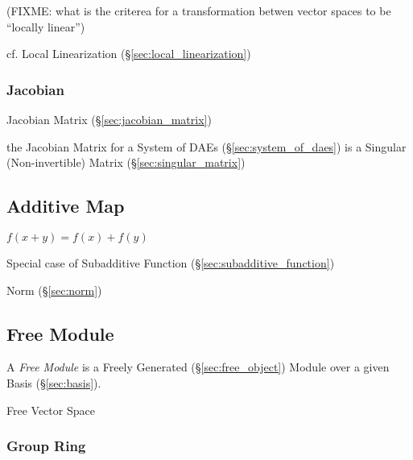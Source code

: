 
(FIXME: what is the criterea for a transformation betwen vector spaces to be
``locally linear'')

\fist cf. Local Linearization (\S\ref{sec:local_linearization})



\subsubsection{Jacobian}\label{sec:jacobian}


Jacobian Matrix (\S\ref{sec:jacobian_matrix})

\fist the Jacobian Matrix for a System of DAEs (\S\ref{sec:system_of_daes}) is
a Singular (Non-invertible) Matrix (\S\ref{sec:singular_matrix})



\subsection{Additive Map}\label{sec:additive_map}

$f(x + y) = f(x) + f(y)$

Special case of Subadditive Function (\S\ref{sec:subadditive_function})

Norm (\S\ref{sec:norm})



\subsection{Free Module}\label{sec:free_module}

A \emph{Free Module} is a Freely Generated (\S\ref{sec:free_object})
Module over a given Basis (\S\ref{sec:basis}).

Free Vector Space



\subsubsection{Group Ring}\label{sec:group_ring}



